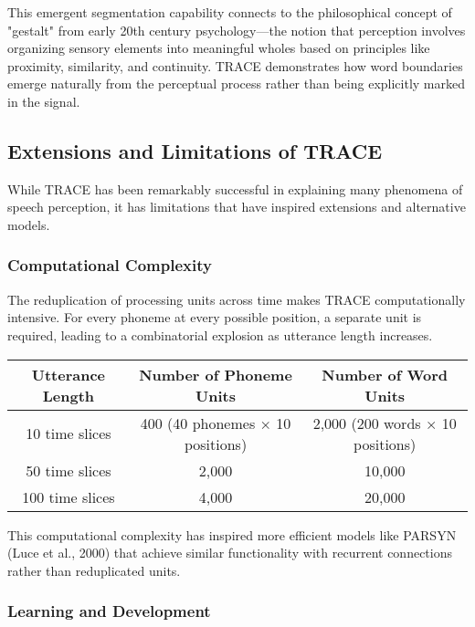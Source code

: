 \documentclass[12pt,a4paper]{article}
\begin{document}
This emergent segmentation capability connects to the philosophical concept of "gestalt" from early 20th century psychology—the notion that perception involves organizing sensory elements into meaningful wholes based on principles like proximity, similarity, and continuity. TRACE demonstrates how word boundaries emerge naturally from the perceptual process rather than being explicitly marked in the signal.

\subsection{Extensions and Limitations of TRACE}

While TRACE has been remarkably successful in explaining many phenomena of speech perception, it has limitations that have inspired extensions and alternative models.

\subsubsection{Computational Complexity}

The reduplication of processing units across time makes TRACE computationally intensive. For every phoneme at every possible position, a separate unit is required, leading to a combinatorial explosion as utterance length increases.

\begin{tcolorbox}[enhanced, colback=red!5, colframe=red!75!black, title=TRACE's Computational Challenge]
\begin{center}
\begin{tabular}{|c|c|c|}
\hline
\textbf{Utterance Length} & \textbf{Number of Phoneme Units} & \textbf{Number of Word Units} \\
\hline
10 time slices & 400 (40 phonemes × 10 positions) & 2,000 (200 words × 10 positions) \\
\hline
50 time slices & 2,000 & 10,000 \\
\hline
100 time slices & 4,000 & 20,000 \\
\hline
\end{tabular}
\end{center}
\small This computational complexity has inspired more efficient models like PARSYN (Luce et al., 2000) that achieve similar functionality with recurrent connections rather than reduplicated units.
\end{tcolorbox}

\subsubsection{Learning and Development}
\end{document}
